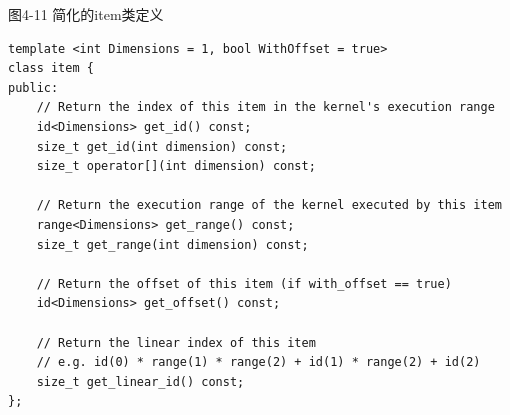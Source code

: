 \hspace*{\fill} \par %
图4-11 简化的item类定义
\begin{lstlisting}[caption={}]
template <int Dimensions = 1, bool WithOffset = true>
class item {
public:
	// Return the index of this item in the kernel's execution range
	id<Dimensions> get_id() const;
	size_t get_id(int dimension) const;
	size_t operator[](int dimension) const;
	
	// Return the execution range of the kernel executed by this item
	range<Dimensions> get_range() const;
	size_t get_range(int dimension) const;
	
	// Return the offset of this item (if with_offset == true)
	id<Dimensions> get_offset() const;
	
	// Return the linear index of this item
	// e.g. id(0) * range(1) * range(2) + id(1) * range(2) + id(2)
	size_t get_linear_id() const;
};
\end{lstlisting}










